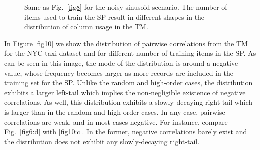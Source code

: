 \documentclass[11pt,letterpaper]{article}
\begin{document}
\begin{figure}[t]
{	    			\label{fig9:c}
		    	}
			    \caption{
			        Same as Fig.~\ref{fig8} for the noisy sinusoid scenario.
			        The number of items used to train the SP result in different
			        shapes in the distribution of column usage in the TM.
			    }
			    \label{fig9}
		    \end{figure}
		    
		    In Figure \ref{fig10} we show the distribution of pairwise correlations from the TM
		    for the NYC taxi dataset and for different number of training items in the SP.
		    As can be seen in this image, the mode of the distribution is around a negative value,
		    whose frequency becomes larger as more records are included in the training set for the
		    SP.
		    Unlike the random and high-order cases, the distribution exhibits a larger left-tail
		    which implies the non-negligible existence of negative correlations.
		    As well, this distribution exhibits a slowly decaying right-tail which is larger
		    than in the random and high-order cases.
		    In any case, pairwise correlations are weak, and in most cases negative.
		    For instance, compare Fig.~\ref{fig6:d} with \ref{fig10:c}.
		    In the former, negative correlations barely exist and the distribution
		    does not exhibit any slowly-decaying right-tail.
		    
\end{document}
